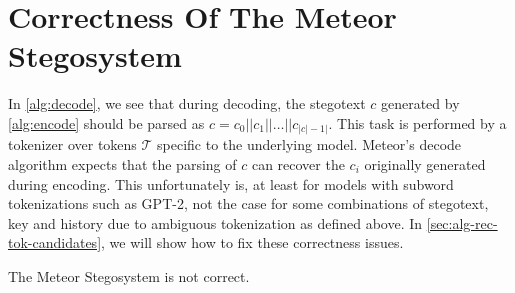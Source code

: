 
\section{Correctness Of The Meteor Stegosystem}

In \autoref{alg:decode}, we see that during decoding, the stegotext $c$ generated by \autoref{alg:encode} should be parsed as $c = c_0 ||c_1 || \dots || c_{|c|-1|}$.
This task is performed by a tokenizer over tokens $\mathcal{T}$ specific to the underlying model.
Meteor's decode algorithm expects that the parsing of $c$ can recover the $c_i$ originally generated during encoding.
This unfortunately is, at least for models with subword tokenizations such as GPT-2, not the case for some combinations of stegotext, key and history due to ambiguous tokenization as defined above.
In \autoref{sec:alg-rec-tok-candidates}, we will show how to fix these correctness issues.

\begin{theorem}
The Meteor Stegosystem is not correct.
\end{theorem}

